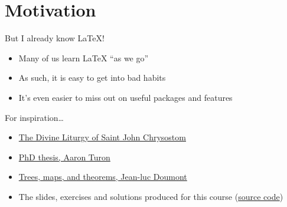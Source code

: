 \section{Motivation}

\begin{frame}{But I already know \LaTeX{}!}
  \begin{itemize}
    \item Many of us learn \LaTeX{} ``as we go''
    \item As such, it is easy to get into bad habits
    \item It's even easier to miss out on useful packages and features
  \end{itemize}
\end{frame}

\begin{frame}{For inspiration\ldots}
  \begin{itemize}
    \item \href{http://www.liturghie.net/pdf/liturgy_ro_en.pdf}%
      {The Divine Liturgy of Saint John Chrysostom}
    \item \href{http://www.ccs.neu.edu/home/turon/thesis.pdf}%
      {PhD thesis, Aaron Turon}
    \item \href{http://www.principiae.be/book/pdfs/TM&Th-samplepages.pdf}%
      {Trees, maps, and theorems, Jean-luc Doumont}
    \item The slides, exercises and solutions produced for this course
      (\href{https://github.com/jwalton3141/latex_course}{source code})
  \end{itemize}
\end{frame}
